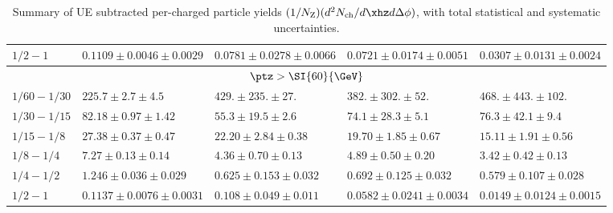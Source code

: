 \begin{table}[!ht]
\begin{center}
\begin{tabular}{|l|l|l|l|l|}
\footnotesize {$1/2 - 1$} & \scriptsize {$0.1109 \pm 0.0046 \pm 0.0029$}  & \scriptsize {$0.0781 \pm 0.0278 \pm 0.0066$}  & \scriptsize {$0.0721 \pm 0.0174 \pm 0.0051$}  & \scriptsize {$0.0307 \pm 0.0131 \pm 0.0024$}  \\
\hline \hline
\multicolumn{5}{|c|}{\small {$\ptz > \SI{60}{\GeV}$}} \\ \hline
\footnotesize {$1/60 - 1/30$} & \scriptsize {$225.7 \pm 2.7 \pm 4.5$}  & \scriptsize {$429. \pm 235. \pm 27.$}  & \scriptsize {$382. \pm 302. \pm 52.$}  & \scriptsize {$468. \pm 443. \pm 102.$}  \\
\footnotesize {$1/30 - 1/15$} & \scriptsize {$82.18 \pm 0.97 \pm 1.42$}  & \scriptsize {$55.3 \pm 19.5 \pm 2.6$}  & \scriptsize {$74.1 \pm 28.3 \pm 5.1$}  & \scriptsize {$76.3 \pm 42.1 \pm 9.4$}  \\
\footnotesize {$1/15 - 1/8$} & \scriptsize {$27.38 \pm 0.37 \pm 0.47$}  & \scriptsize {$22.20 \pm 2.84 \pm 0.38$}  & \scriptsize {$19.70 \pm 1.85 \pm 0.67$}  & \scriptsize {$15.11 \pm 1.91 \pm 0.56$}  \\
\footnotesize {$1/8 - 1/4$} & \scriptsize {$7.27 \pm 0.13 \pm 0.14$}  & \scriptsize {$4.36 \pm 0.70 \pm 0.13$}  & \scriptsize {$4.89 \pm 0.50 \pm 0.20$}  & \scriptsize {$3.42 \pm 0.42 \pm 0.13$}  \\
\footnotesize {$1/4 - 1/2$} & \scriptsize {$1.246 \pm 0.036 \pm 0.029$}  & \scriptsize {$0.625 \pm 0.153 \pm 0.032$}  & \scriptsize {$0.692 \pm 0.125 \pm 0.032$}  & \scriptsize {$0.579 \pm 0.107 \pm 0.028$}  \\
\footnotesize {$1/2 - 1$} & \scriptsize {$0.1137 \pm 0.0076 \pm 0.0031$}  & \scriptsize {$0.108 \pm 0.049 \pm 0.011$}  & \scriptsize {$0.0582 \pm 0.0241 \pm 0.0034$}  & \scriptsize {$0.0149 \pm 0.0124 \pm 0.0015$}  \\
\hline
\end{tabular}
\caption{Summary of UE subtracted per-\Zboson charged particle yields $(1/N_\mathrm{Z})(d^2N_\mathrm{ch}/d\xhz d\Delta\phi)$, with total statistical and systematic uncertainties.}
\label{tab2}
\end{center}
\end{table}
